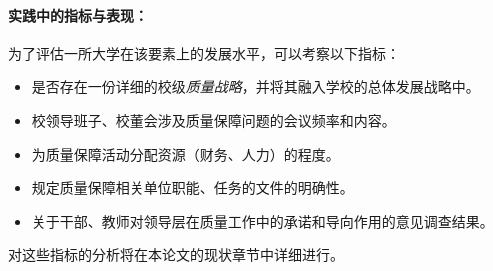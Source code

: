 \paragraph{实践中的指标与表现：}
为了评估一所大学在该要素上的发展水平，可以考察以下指标：
\begin{itemize}
    \item 是否存在一份详细的校级\textit{质量战略}，并将其融入学校的总体发展战略中。
    \item 校领导班子、校董会涉及质量保障问题的会议频率和内容。
    \item 为质量保障活动分配资源（财务、人力）的程度。
    \item 规定质量保障相关单位职能、任务的文件的明确性。
    \item 关于干部、教师对领导层在质量工作中的承诺和导向作用的意见调查结果。
\end{itemize}
对这些指标的分析将在本论文的现状章节中详细进行。

























